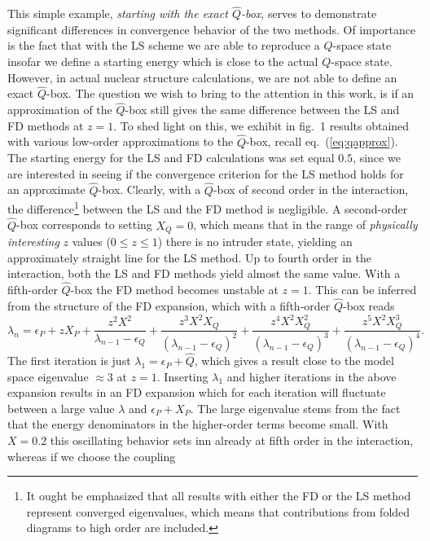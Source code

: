 This simple example, {\em starting with the
exact $\hat{Q}$-box},  serves to demonstrate significant
differences in convergence behavior of the two methods. Of
importance is the fact that with the LS scheme
we are able to reproduce a
$Q$-space state insofar we define a starting energy which is
close to the actual $Q$-space state.
However, in actual nuclear structure calculations, we are not
able to define an exact $\hat{Q}$-box. The question we wish
to bring to the attention in this work, is if an
approximation of the $\hat{Q}$-box still gives the same
difference between the LS and FD methods at $z=1$.
To shed light on this, we exhibit in 
fig.\ 1 results obtained with various low-order
approximations to the $\hat{Q}$-box, recall eq.\ (\ref{eq:qapprox}).
The starting energy for the LS and 
FD calculations was set equal $0.5$, since
we are interested in seeing if the convergence criterion for the
LS method holds for an approximate $\hat{Q}$-box. 
Clearly, with a $\hat{Q}$-box of second order
in the interaction, the
difference\footnote{It ought be emphasized that all results
with either the FD or the LS method represent converged
eigenvalues, which means that contributions from folded diagrams
to high order are included.}
between the LS and the FD method is negligible. 
A second-order $\hat{Q}$-box corresponds to setting $X_Q=0$, which
means that in the range of {\em physically interesting} 
$z$ values ($0\leq z \leq 1$)
there is no intruder state, yielding an approximately straight line
for the LS method.
Up to fourth order in the interaction, both 
the LS and FD methods yield almost 
the same value. With a fifth-order
$\hat{Q}$-box the FD method becomes unstable at $z=1$.
This can 
be inferred from the structure of the FD expansion, 
which with a fifth-order $\hat{Q}$-box
reads
\[
     \lambda_n=\epsilon_P+zX_P+\frac{z^2X^2}{\lambda_{n-1} -\epsilon_Q}+
      \frac{z^3X^2X_Q}{(\lambda_{n-1} -\epsilon_Q)^2}+
      \frac{z^4X^2X_Q^2}{(\lambda_{n-1} -\epsilon_Q)^3}+
     \frac{z^5X^2X_Q^3}{(\lambda_{n-1} -\epsilon_Q)^4}.
\] 
The first iteration is just $\lambda_1=\epsilon_P+\hat{Q}$, 
which gives a result close to the model space eigenvalue
$\approx 3$ at $z=1$. Inserting $\lambda_1$ and higher iterations
in the above expansion
results in an
FD expansion which for each iteration will fluctuate
between a large value $\lambda$ and $\epsilon_P+X_P$. 
The large eigenvalue stems
from the fact that the energy denominators in the higher-order terms become
small. With $X=0.2$ this oscillating behavior sets inn already at fifth 
order in the interaction, whereas 
if we choose the coupling
